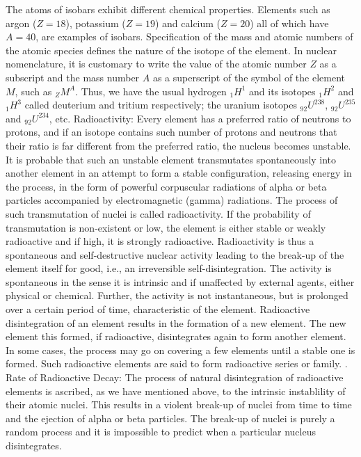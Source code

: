 The atoms of isobars exhibit different chemical properties.
Elements such as argon ($Z=18$), potassium ($Z=19$) and calcium ($Z=20$) all of which have $A=40$, are examples of isobars.
\smallskip
Specification of the mass and atomic numbers of the atomic species defines the nature of the isotope of the element.
In nuclear nomenclature, it is customary to write the value of the atomic number $Z$ as a subscript and the mass number $A$ as a superscript of the symbol of the element $M$, such as $_ZM^A$.
Thus, we have the usual hydrogen $_1H^1$ and its isotopes $_1H^2$ and $_1H^3$ called deuterium and tritium respectively; the uranium isotopes $_{92}U^{238}$, $_{92}U^{235}$ and $_{92}U^{234}$, etc.
\bigskip
\noindent
{\sc Radioactivity:}
\smallskip
Every element has a preferred ratio of neutrons to protons, and if an isotope contains such number of protons and neutrons that their ratio is far different from the preferred ratio, the nucleus becomes unstable.
It is probable that such an unstable element transmutates spontaneously into another element in an attempt to form a stable configuration, releasing energy in the process, in the form of powerful corpuscular radiations of alpha or beta particles accompanied by electromagnetic (gamma) radiations.
The process of such transmutation of nuclei is called radioactivity.
If the probability of transmutation is non-existent or low, the element is either stable or weakly radioactive and if high, it is strongly radioactive.
Radioactivity is thus a spontaneous and self-destructive nuclear activity leading to the break-up of the element itself for good, i.e., an irreversible self-disintegration.
The activity is spontaneous in the sense it is intrinsic and if unaffected by external agents, either physical or chemical.
Further, the activity is not instantaneous, but is prolonged over a certain period of time, characteristic of the element.
\smallskip
Radioactive disintegration of an element results in the formation of a new element.
The new element this formed, if radioactive, disintegrates again to form another element.
In some cases, the process may go on covering a few elements until a stable one is formed.
Such radioactive elements are said to form radioactive series or family.
\bigskip
\noindent
{. Rate of Radioactive Decay:}
\smallskip
The process of natural disintegration of radioactive elements is ascribed, as we have mentioned above, to the intrinsic instablility of their atomic nuclei.
This results in a violent break-up of nuclei from time to time and the ejection of alpha or beta particles.
\smallskip
The break-up of nuclei is purely a random process and it is impossible to predict when a particular nucleus disintegrates.
